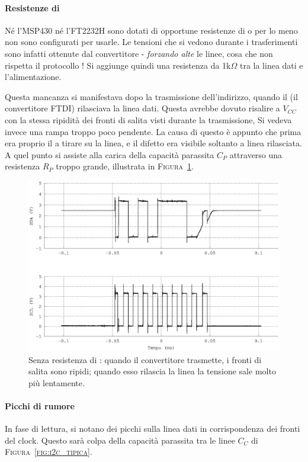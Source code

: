 \paragraph{Resistenze di {\pullup}}
Né l'{MSP430} né l'{FT2232H}
sono dotati di opportune resistenze di {\pullup}
o per lo meno non sono configurati per usarle.
Le tensioni che si vedono durante i trasferimenti
sono infatti ottenute dal convertitore {\iic}-{\usb}
\emph{forzando alte} le linee,
cosa che non rispetta il protocollo {\iic}!
Si aggiunge quindi una resistenza da 1k$\Omega$
tra la linea dati e l'alimentazione.

Questa mancanza si manifestava dopo la trasmissione dell'indirizzo,
quando il \master{} (il convertitore {FTDI})
rilasciava la linea dati.
Questa avrebbe dovuto risalire a $V_{CC}$ con la stessa ripidità
dei fronti di salita visti durante la trasmissione,
Si vedeva invece una rampa troppo poco pendente.
La causa di questo è appunto che prima era proprio il \master{}
a tirare su la linea, e il difetto era visibile soltanto
a linea rilasciata. A quel punto si assiste
alla carica della capacità parassita $C_P$
attraverso una resistenza $R_P$ troppo grande,
illustrata in \textsc{Figura~\ref{fig:i2c_rampa}}.\\

\begin{figure}
\centering
  \includegraphics[width=.5\textwidth]{RampaNero}
	\caption{Senza resistenza di \pullup{}: quando il convertitore trasmette, i fronti di salita sono ripidi; quando esso rilascia la linea la tensione sale molto più lentamente.}
    \label{fig:i2c_rampa}
\end{figure}

\paragraph{Picchi di rumore}
In fase di lettura, si notano dei picchi sulla linea dati
in corrispondenza dei fronti del clock.
Questo sarà colpa della capacità parassita
tra le linee $C_C$ di \textsc{Figura~\ref{fig:i2c_tipica}}.\\

